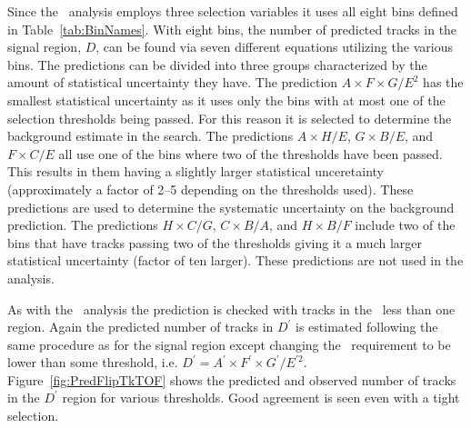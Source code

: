 Since the \tktof\ analysis employs three selection variables it uses all eight bins defined in Table~\ref{tab:BinNames}.
With eight bins, the number of predicted tracks in the signal region, $D$, can be found via seven different equations utilizing the various bins.
The predictions can be divided into three groups characterized by the amount of statistical uncertainty they have.
The prediction $A\times F\times G/E^2$ has the smallest statistical uncertainty as it uses only the bins with at most one of the selection thresholds being passed.
For this reason it is selected to determine the background estimate in the search.
The predictions $A\times H / E$, $G\times B / E$, and $F\times C / E$ all use one of the bins where two of the thresholds have been passed.
This results in them having a slightly larger statistical unceretainty (approximately a factor of 2--5 depending on the thresholds used).
These predictions are used to determine the systematic uncertainty on the background prediction.
The predictions $H\times C / G$, $C\times B / A$, and $H\times B / F$ include two of the bins that have tracks passing two of the thresholds giving it a much larger
statistical uncertainty (factor of ten larger). These predictions are not used in the analysis.

As with the \muononly\ analysis the prediction is checked with tracks in the \invbeta\ less than one region. Again the predicted number of tracks in
$D^{\prime}$ is estimated following the same procedure as for the signal region except changing the \invbeta\ requirement to be lower than some threshold,
i.e. $D^{\prime} = A^{\prime}\times F^{\prime}\times G^{\prime} / E^{\prime 2}$.
Figure~\ref{fig:PredFlipTkTOF} shows the predicted and observed number of tracks in the $D^{\prime}$ region for various thresholds. Good agreement is seen
even with a tight selection.

